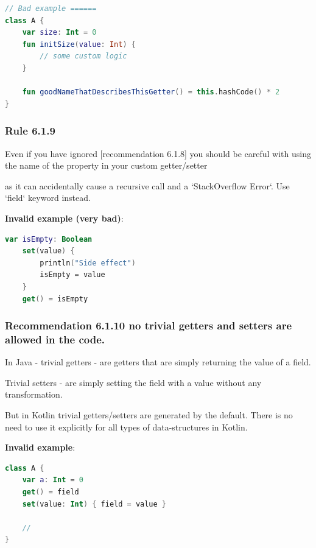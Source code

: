 {{{{\begin{lstlisting}[language=Kotlin]
// Bad example ======
class A {
    var size: Int = 0
    fun initSize(value: Int) {
        // some custom logic
    }
    
    fun goodNameThatDescribesThisGetter() = this.hashCode() * 2
}
\end{lstlisting}


\subsubsection*{\textbf{Rule 6.1.9}}
\leavevmode\newline

Even if you have ignored [recommendation 6.1.8] you should be careful with using the name of the property in your custom getter/setter

as it can accidentally cause a recursive call and a `StackOverflow Error`. Use `field` keyword instead.



\textbf{Invalid example (very bad)}:

\begin{lstlisting}[language=Kotlin]
var isEmpty: Boolean
    set(value) {
        println("Side effect")
        isEmpty = value
    }
    get() = isEmpty
\end{lstlisting}


\subsubsection*{\textbf{Recommendation 6.1.10 no trivial getters and setters are allowed in the code.}}
\leavevmode\newline

In Java - trivial getters - are getters that are simply returning the value of a field.

Trivial setters - are simply setting the field with a value without any transformation.

But in Kotlin trivial getters/setters are generated by the default. There is no need to use it explicitly for all types of data-structures in Kotlin.



\textbf{Invalid example}:

\begin{lstlisting}[language=Kotlin]
class A {
    var a: Int = 0 
    get() = field
    set(value: Int) { field = value }

    //
}
\end{lstlisting}


}}}}
